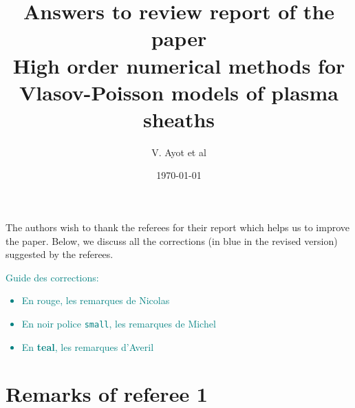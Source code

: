 \documentclass{article}
\title{Answers to review report of the paper\\
\textbf{High order numerical methods for Vlasov-Poisson models of plasma sheaths}}
\author{V. Ayot et al}
\date{\today}
\begin{document}
\maketitle
\Large

The authors  wish to thank the referees for their report which helps us to improve the paper. Below, we discuss all the corrections (in blue in the revised version) suggested by the referees.

\textcolor{teal}{Guide des corrections: 
\begin{itemize}
\item En {\color{red}rouge}, les remarques de Nicolas
\item En {\color{black}\small noir police \texttt{small}}, les remarques de Michel
\item En \textbf{teal}, les remarques d'Averil
\end{itemize}}

\section{Remarks of referee 1}
\end{document}
